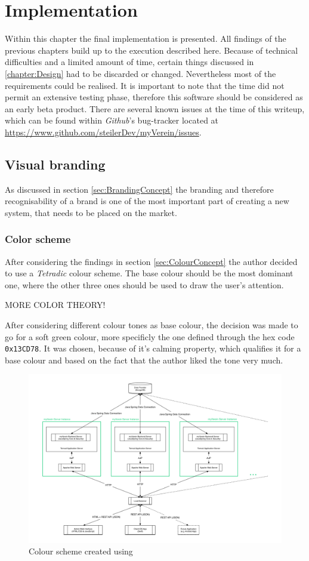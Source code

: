 \chapter{Implementation}
\label{chapter:Implementation}
Within this chapter the final implementation is presented. All findings of the previous chapters build up to the execution described here. Because of technical difficulties and a limited amount of time, certain things discussed in \vref{chapter:Design} had to be discarded or changed. Nevertheless most of the requirements could be realised. It is important to note that the time did not permit an extensive testing phase, therefore this software should be considered as an early beta product. There are several known issues at the time of this writeup, which can be found within \emph{Github}'s bug-tracker located at \url{https://www.github.com/steilerDev/myVerein/issues}.

\section{Visual branding}
As discussed in section \vref{sec:BrandingConcept} the branding and therefore recognisability of a brand is one of the most important part of creating a new system, that needs to be placed on the market. 

\subsection{Color scheme}
After considering the findings in section \vref{sec:ColourConcept} the author decided to use a \emph{Tetradic} colour scheme. The base colour should be the most dominant one, where the other three ones should be used to draw the user's attention. 


MORE COLOR THEORY!

After considering different colour tones as base colour, the decision was made to go for a soft green colour, more specificly the one defined through the hex code \texttt{0x13CD78}. It was chosen, because of it's calming property, which qualifies it for a base colour and based on the fact that the author liked the tone very much.

\begin{figure}[h]
  	\centering
  	\includegraphics[width=0.95\linewidth]{./images/architecture.png}
  	\caption{Colour scheme created using \cite{Paletton:2015aa}}
	\label{fig:ColourScheme}
\end{figure}

